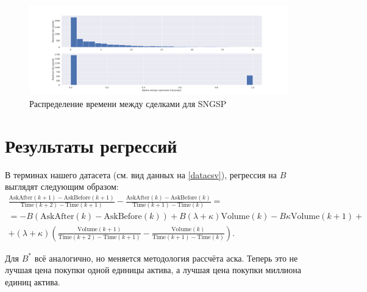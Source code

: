 \begin{figure}
    \includegraphics[scale=0.35]{fig/timedistr/SE/SNGSP.pdf}
    \caption{Распределение времени между сделками для SNGSP}
    \label{TimeDistrSNGSPWP}
\end{figure}


\section{Результаты регрессий}
    В терминах нашего датасета (см. вид данных на \ref{datacsv}), регрессия на $B$ выглядят следующим образом:
\begin{align*}
    \frac{\textrm{AskAfter}(k+1) - \textrm{AskBefore}(k+1)}{\textrm{Time}(k+2) - \textrm{Time}(k+1)} 
    - \frac{\textrm{AskAfter}(k) - \textrm{AskBefore}(k)}{\textrm{Time}(k+1) - \textrm{Time}(k)}
    = \\ 
    = -B (\textrm{AskAfter}(k) - \textrm{AskBefore}(k)) + B (\lambda + \kappa) \textrm{Volume}(k) 
    - B \kappa \textrm{Volume}(k+1) + \\
    + (\lambda + \kappa) \left(\frac{\textrm{Volume}(k+1)}{\textrm{Time}(k+2) - \textrm{Time}(k+1)} 
    - \frac{\textrm{Volume}(k)}{\textrm{Time}(k+1) - \textrm{Time}(k)}\right).
\end{align*}
\par
Для $B ^*$ всё аналогично, но меняется методология рассчёта аска. Теперь это не лучшая цена покупки
одной единицы актива, а лучшая цена покупки миллиона единиц актива. \par
